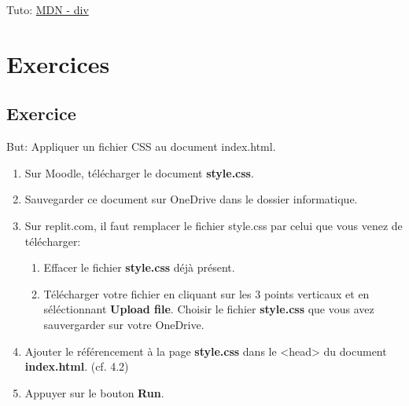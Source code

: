 \documentclass[a4paper,11pt]{article}
\begin{document}
Tuto: \href{https://developer.mozilla.org/fr/docs/Web/HTML/Element/div}{MDN - div}

\section{Exercices}
\subsection{Exercice}
But: Appliquer un fichier CSS au document index.html.
\begin{enumerate}
\item Sur Moodle, télécharger le document \textbf{style.css}.
\item Sauvegarder ce document sur OneDrive dans le dossier informatique.
\item Sur replit.com, il faut remplacer le fichier style.css par celui que vous venez de télécharger:
\begin{enumerate}
  \item Effacer le fichier \textbf{style.css} déjà présent.
  \item Télécharger votre fichier en cliquant sur les 3 points verticaux et en séléctionnant \textbf{Upload file}. Choisir le fichier \textbf{ style.css} que vous avez sauvergarder sur votre OneDrive.
\end{enumerate}
\item Ajouter le référencement à la page \textbf{style.css} dans le <head> du document \textbf{index.html}. (cf. 4.2)
\item Appuyer sur le bouton \textbf{Run}.
\end{enumerate}
\end{document}
